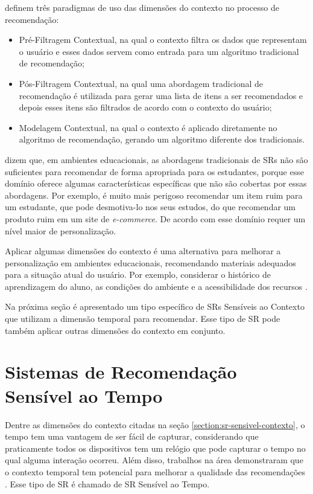  definem três paradigmas de uso das dimensões do contexto no processo de recomendação:

\begin{itemize}
\item Pré-Filtragem Contextual, na qual o contexto filtra os dados que representam o usuário e esses dados servem
como entrada para um algoritmo tradicional de recomendação;
\item Pós-Filtragem Contextual, na qual uma abordagem tradicional de recomendação é utilizada para gerar uma lista de
itens a ser recomendados e depois esses itens são filtrados de acordo com o contexto do usuário;
\item Modelagem Contextual, na qual o contexto é aplicado diretamente no algoritmo de recomendação, gerando um
algoritmo diferente dos tradicionais.
\end{itemize}

 dizem que, em ambientes educacionais, as abordagens tradicionais de SRs não são
suficientes para recomendar de forma apropriada para os estudantes, porque esse domínio oferece algumas características
específicas que não são cobertas por essas abordagens. Por exemplo, é muito mais perigoso recomendar um item ruim para
um estudante, que pode desmotiva-lo nos seus estudos, do que recomendar um produto ruim em um site de \textit{e-commerce}.
De acordo com  esse domínio requer um nível maior de personalização.

Aplicar algumas dimensões do contexto é uma alternativa para melhorar a personalização em ambientes educacionais,
recomendando materiais adequados para a situação atual do usuário. Por exemplo, considerar o histórico de aprendizagem
do aluno, as condições do ambiente e a acessibilidade dos recursos \cite{verbert2012context}.

Na próxima seção é apresentado um tipo específico de SRs Sensíveis ao Contexto que utilizam a dimensão temporal para
recomendar. Esse tipo de SR pode também aplicar outras dimensões do contexto em conjunto.

\section{Sistemas de Recomendação Sensível ao Tempo}

Dentre as dimensões do contexto citadas na seção \ref{section:sr-sensivel-contexto}, o tempo tem uma vantagem de ser
fácil de capturar, considerando que praticamente todos os dispositivos tem um relógio que pode capturar o tempo no qual
alguma interação ocorreu. Além disso, trabalhos na área demonstraram que o contexto temporal tem potencial para melhorar
a qualidade das recomendações \cite{campos2014time}. Esse tipo de SR é chamado de SR Sensível ao Tempo.

